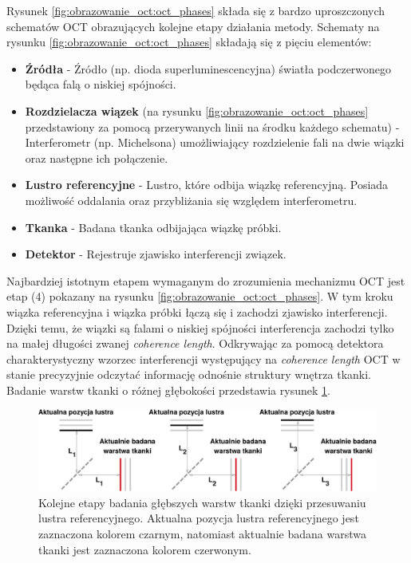 Rysunek \ref{fig:obrazowanie_oct:oct_phases} składa się z bardzo uproszczonych schematów OCT obrazujących kolejne etapy działania metody. Schematy na rysunku \ref{fig:obrazowanie_oct:oct_phases} składają się z pięciu elementów:

\begin{itemize}

\item \textbf{Źródła} - Źródło (np. dioda superluminescencyjna) światła podczerwonego będąca falą o niskiej spójności.
\item \textbf{Rozdzielacza wiązek} (na rysunku \ref{fig:obrazowanie_oct:oct_phases} przedstawiony za pomocą przerywanych linii na środku każdego schematu) - Interferometr (np. Michelsona) umożliwiający rozdzielenie fali na dwie wiązki oraz następne ich połączenie.
\item \textbf{Lustro referencyjne} - Lustro, które odbija wiązkę referencyjną. Posiada możliwość oddalania oraz przybliżania się względem interferometru.
\item \textbf{Tkanka} - Badana tkanka odbijająca wiązkę próbki.
\item \textbf{Detektor} - Rejestruje zjawisko interferencji związek.

\end{itemize}

Najbardziej istotnym etapem wymaganym do zrozumienia mechanizmu OCT jest etap (4) pokazany na rysunku \ref{fig:obrazowanie_oct:oct_phases}. W tym kroku wiązka referencyjna i wiązka próbki łączą się i zachodzi zjawisko interferencji. Dzięki temu, że wiązki są falami o niskiej spójności interferencja zachodzi tylko na małej długości zwanej \textit{coherence length}. Odkrywając za pomocą detektora charakterystyczny wzorzec interferencji występujący na \textit{coherence length} OCT w stanie precyzyjnie odczytać informację odnośnie struktury wnętrza tkanki. Badanie warstw tkanki o różnej głębokości przedstawia rysunek \ref{fig:obrazowanie_oct:tissue_layers}.

\begin{figure}[htb]
	\centering
	\includegraphics[width=\textwidth]{gfx/tissue_layers}
	\caption{Kolejne etapy badania głębszych warstw tkanki dzięki przesuwaniu lustra referencyjnego. Aktualna pozycja lustra referencyjnego jest zaznaczona kolorem czarnym, natomiast aktualnie badana warstwa tkanki jest zaznaczona kolorem czerwonym.}
	\label{fig:obrazowanie_oct:tissue_layers}
\end{figure}

